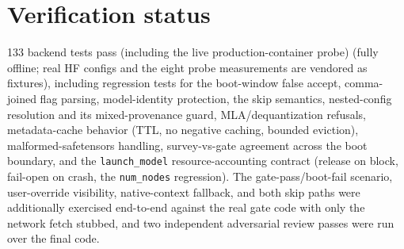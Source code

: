 \documentclass[11pt]{article}
\newcommand{\code}[1]{\texttt{#1}}
\begin{document}
\section{Verification status}

133 backend tests pass (including the live production-container probe) (fully offline; real HF configs and the eight probe
measurements are vendored as fixtures), including regression tests for the
boot-window false accept, comma-joined flag parsing, model-identity
protection, the skip semantics, nested-config resolution and its
mixed-provenance guard, MLA/dequantization refusals, metadata-cache behavior
(TTL, no negative caching, bounded eviction), malformed-safetensors handling,
survey-vs-gate agreement across the boot boundary, and the
\code{launch\_model} resource-accounting contract (release on block, fail-open
on crash, the \code{num\_nodes} regression). The gate-pass/boot-fail scenario,
user-override visibility, native-context fallback, and both skip paths were
additionally exercised end-to-end against the real gate code with only the
network fetch stubbed, and two independent adversarial review passes were run
over the final code.
\end{document}
